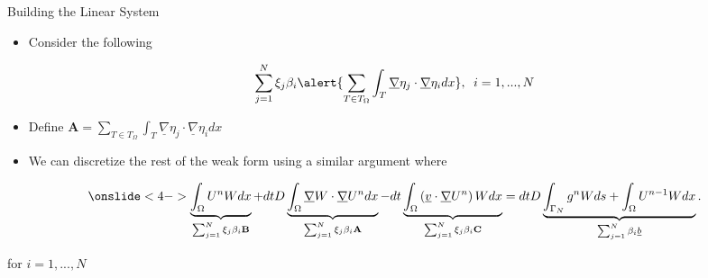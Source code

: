 \documentclass[10pt]{beamer}
\begin{document}
\begin{frame}{Building the Linear System}\label{BuildLinearSystem}
\begin{itemize}
\item Consider the following
\end{itemize}
\begin{equation}
\sum_{j=1}^{N} \xi_{j}\beta_{i}\alert{\sum_{T \in T_{\Omega}}\int_{T} \underline{\nabla} \eta_{j} \cdot \underline{\nabla}\eta_{i} dx}, \texttt{ } i=1,...,N
\end{equation}

\begin{itemize}
\item Define $\mathbf{A} = \sum_{T \in T_{\Omega}}\int_{T} \underline{\nabla} \eta_{j} \cdot \underline{\nabla}\eta_{i} dx$
\end{itemize}

\begin{itemize}
\item We can discretize the rest of the weak form using a similar argument where
\end{itemize}

\footnotesize
\begin{equation}\onslide<4->
\underbrace{\int_{\Omega}U^{n}W dx}_{\sum_{j=1}^{N} \xi_{j}\beta_{i}\mathbf{B}} +dtD\underbrace{\int_{\Omega}\underline{\nabla}W \cdot \underline{\nabla} U^{n} dx}_{\sum_{j=1}^{N} \xi_{j}\beta_{i}\mathbf{A}}-dt\underbrace{\int_{\Omega}\left(\underline{v}\cdot \underline{\nabla}U^{n}\right)W dx}_{\sum_{j=1}^{N} \xi_{j}\beta_{i}\mathbf{C}}=dtD\underbrace{\int_{\Gamma_{N}}g^{n}W ds+ \int_{\Omega} U^{n-1}W dx}_{\sum_{j=1}^{N} \beta_{i}\underline{b}}.
\end{equation}

\normalsize
for $i=1,...,N$
\hyperlink{Questions}{}
\end{frame}
\end{document}
